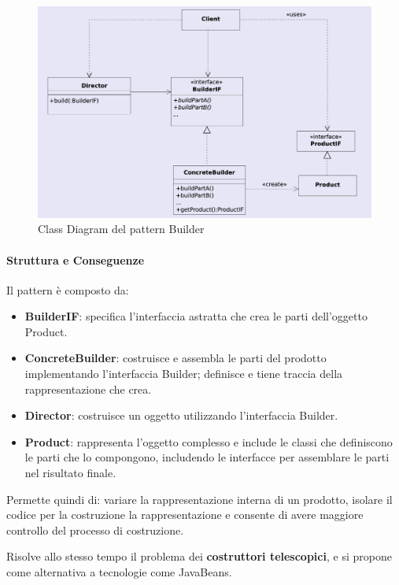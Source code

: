 \begin{figure}[H]
    \centering
    \includegraphics[width=1\linewidth]{assets/pattern/builder/builder-struttura.png}
    \caption{Class Diagram del pattern Builder}
\end{figure}

\paragraph{Struttura e Conseguenze} Il pattern è composto da:
\begin{itemize}
    \item \textbf{BuilderIF}: specifica l’interfaccia astratta che crea le parti dell’oggetto Product. 
    \item \textbf{ConcreteBuilder}: costruisce e assembla le parti del prodotto implementando l’interfaccia Builder; definisce e tiene traccia della rappresentazione che crea.
    \item \textbf{Director}: costruisce un oggetto utilizzando l’interfaccia Builder.
    \item \textbf{Product}: rappresenta l’oggetto complesso e include le classi che definiscono le parti che lo compongono, includendo le interfacce per assemblare le parti nel risultato finale.
\end{itemize}

Permette quindi di: variare la rappresentazione interna di un prodotto, isolare il codice per la costruzione la rappresentazione e consente di avere maggiore controllo del processo di costruzione.

Risolve allo stesso tempo il problema dei \textbf{costruttori telescopici}, e si propone come alternativa a tecnologie come JavaBeans.

